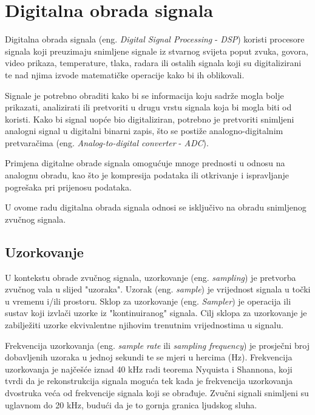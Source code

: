 \documentclass[times, utf8, zavrsni, numeric]{fer}
\begin{document}
%

\chapter{Digitalna obrada signala}
Digitalna obrada signala (eng. \textit{Digital Signal Processing} - \textit{DSP}) koristi procesore signala koji preuzimaju snimljene signale iz stvarnog svijeta poput zvuka, govora, video prikaza, temperature, tlaka, radara ili ostalih signala koji su digitalizirani te nad njima izvode matematičke operacije kako bi ih oblikovali.

Signale je potrebno obraditi kako bi se informacija koju sadrže mogla bolje prikazati, analizirati ili pretvoriti u drugu vrstu signala koja bi mogla biti od koristi. Kako bi signal uopće bio digitaliziran, potrebno je pretvoriti snimljeni analogni signal u digitalni binarni zapis, što se postiže analogno-digitalnim pretvaračima (eng. \textit{Analog-to-digital converter} - \textit{ADC}).

Primjena digitalne obrade signala omogućuje mnoge prednosti u odnosu na analognu obradu, kao što je kompresija podataka ili otkrivanje i ispravljanje pogrešaka pri prijenosu podataka.\cite{broesch2008digital}

U ovome radu digitalna obrada signala odnosi se isključivo na obradu snimljenog zvučnog signala.

\section{Uzorkovanje}
U kontekstu obrade zvučnog signala, uzorkovanje (eng. \textit{sampling}) je pretvorba zvučnog vala u slijed "uzoraka". Uzorak (eng. \textit{sample}) je vrijednost signala u točki u vremenu i/ili prostoru. Sklop za uzorkovanje (eng. \textit{Sampler}) je operacija ili sustav koji izvlači uzorke iz "kontinuiranog" signala. Cilj sklopa za uzorkovanje je zabilježiti uzorke ekvivalentne njihovim trenutnim vrijednostima u signalu. 

Frekvencija uzorkovanja (eng. \textit{sample rate} ili \textit{sampling frequency}) je prosječni broj dobavljenih uzoraka u jednoj sekundi te se mjeri u hercima (Hz). Frekvencija uzorkovanja je najčešće iznad 40 kHz radi teorema Nyquista i Shannona, koji tvrdi da je rekonstrukcija signala moguća tek kada je frekvencija uzorkovanja dvostruka veća od frekvencije signala koji se obrađuje.\cite{candes2008introduction} Zvučni signali snimljeni su uglavnom do 20 kHz, budući da je to gornja granica ljudskog sluha.
\end{document}
